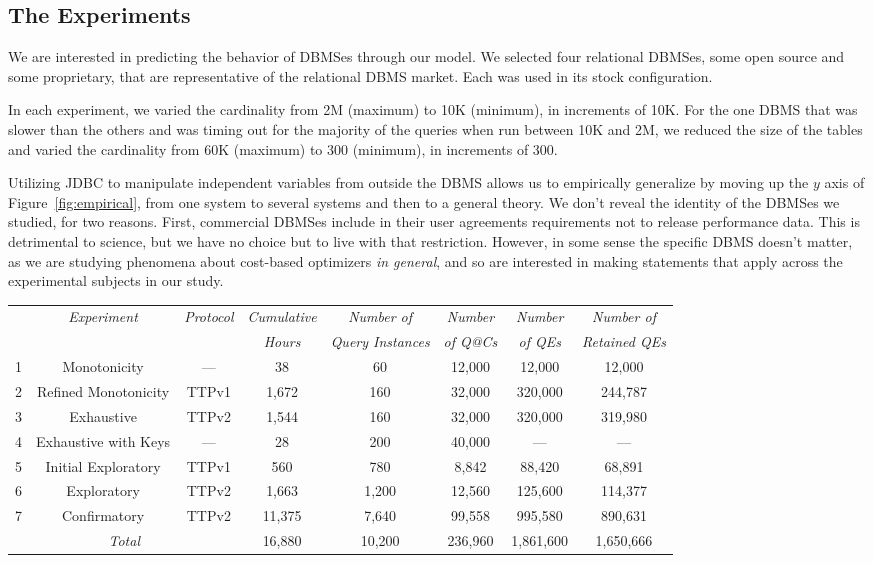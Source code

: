 \documentclass[prodmode,acmtods]{acmsmall}
\begin{document}
\subsection{The Experiments}\label{sec:experiments}

We are interested in predicting the behavior of \hbox{DBMSes} through our
model. We selected four relational
\hbox{DBMSes}, some open source and some proprietary, that are representative of
the relational \hbox{DBMS} market. Each was used in its stock configuration.

In each experiment, we varied the
cardinality from 2M (maximum) to 10K (minimum), in increments of 10K. For
the one \hbox{DBMS} that was slower than the others and was timing out for
the majority of the queries when run between 10K and 2M, we reduced the
size of the tables and varied the cardinality from 60K (maximum) to 300 
(minimum), in increments of 300.

Utilizing JDBC to manipulate independent variables from outside the
  \hbox{DBMS} allows us to empirically generalize by moving up the $y$ axis of
  Figure~\ref{fig:empirical}, from one system to several systems and then to
  a general theory. We don't reveal the identity of the \hbox{DBMSes} we studied, for two reasons. First, commercial \hbox{DBMSes}
include in their user agreements requirements not to release 
performance data. This is detrimental to science, but we have no choice but
to live with that restriction. However, in some sense the specific \hbox{DBMS}
doesn't matter, as we are studying phenomena about cost-based optimizers
{\em in general}, and so are interested in making statements that apply across
the experimental subjects in our study.

\begin{table}[t]
{%
\resizebox{140mm}{!}
{
\begin{tabular}{c|c|c|c|c|c|c|c}
& {\em Experiment}& {\em Protocol} & {\em Cumulative} & {\em Number of}&{\em
    Number} &{\em Number}& {\em Number of}\\
& & & {\em Hours} & {\em Query Instances}&{\em of Q@Cs} &{\em of QEs}&{\em Retained QEs}\\
\hline
1 & Monotonicity 		& --- & 38 & 60 & 12,000 & 12,000 & 12,000\\
2 & Refined Monotonicity 		& TTPv1 & 1,672 & 160 & 32,000 & 320,000 & 244,787\\
3 & Exhaustive 			& TTPv2 & 1,544 & 160 & 32,000 & 320,000 & 319,980\\
4 & Exhaustive with Keys 	& --- & 28 & 200 & 40,000 & --- & ---\\
5 & Initial Exploratory 	& TTPv1 & 560 & 780 & 8,842 & 88,420 & 68,891\\%
6 & Exploratory 		& TTPv2 & 1,663 & 1,200 & 12,560 & 125,600 & 114,377\\
7 & Confirmatory 		& TTPv2 & 11,375 & 7,640 & 99,558 & 995,580 & 890,631\\
\multicolumn{3}{c|}{\em Total}	& 16,880 & 10,200 & 236,960 & 1,861,600 & 1,650,666\\
\end{tabular}
}
}
\end{table}
\end{document}
